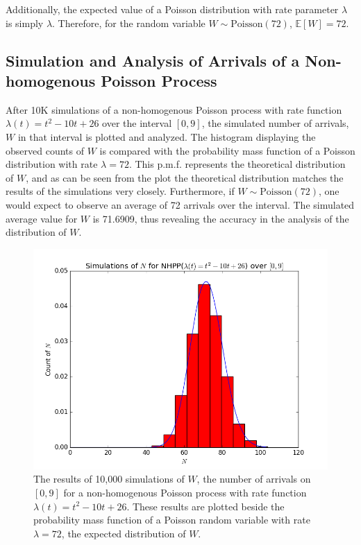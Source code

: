\documentclass[11pt, oneside]{article}   	%
\begin{document}
Additionally, the expected value of a Poisson distribution with rate parameter $\lambda$ is simply $\lambda$. Therefore, for the random variable $W \sim \text{Poisson}(72)$, $\mathbb{E}[W]=72$.

\subsection{Simulation and Analysis of Arrivals of a Non-homogenous Poisson Process}
After 10K simulations of a non-homogenous Poisson process with rate function $\lambda(t) =t^2-10t+26$ over the interval $[0,9]$, the simulated number of arrivals, $W$ in that interval is plotted and analyzed. The histogram displaying the observed counts of $W$ is compared with the probability mass function of a Poisson distribution with rate $\lambda = 72$. This p.m.f. represents the theoretical distribution of $W$, and as can be seen from the plot the theoretical distribution matches the results of the simulations very closely. Furthermore, if $W \sim \text{Poisson}(72)$, one would expect to observe an average of 72 arrivals over the interval. The simulated average value for $W$ is 71.6909, thus revealing the accuracy in the analysis of the distribution of $W$.
\begin{figure}[H]
\includegraphics[scale=.5]{nhpp_n}
\caption{The results of 10,000 simulations of $W$, the number of arrivals on $[0,9]$ for a non-homogenous Poisson process with rate function $\lambda(t)=t^2-10t+26$. These results are plotted beside the probability mass function of a Poisson random variable with rate $\lambda=72$, the expected distribution of $W$.}
\label{fig:x}
\end{figure}
\end{document}

